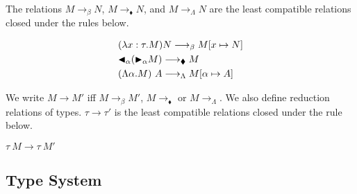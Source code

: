     The relations $M \longrightarrow_\beta N$, $M \longrightarrow_\blacklozenge N$, and $M \longrightarrow_\Lambda N$ are the least compatible relations closed under the rules below.
\begin{center}
  \begin{align*}
     & (\lambda x:\tau.M) N \longrightarrow_\beta M[x \mapsto N]         \\
     & {\mathop{\blacktriangleleft}}_\alpha ({\mathop{\blacktriangleright}}_\alpha M)\longrightarrow_\blacklozenge M         \\
     & (\Lambda \alpha.M)\ A \longrightarrow_\Lambda M[\alpha \mapsto A]
  \end{align*}
\end{center}

We write \( M \longrightarrow M' \) iff \( M \longrightarrow_{\beta} M' \), \(
M \longrightarrow_\blacklozenge \) or \( M \longrightarrow_\Lambda \). We also
define reduction relations of types. \( \tau \longrightarrow \tau' \) is the
least compatible relations closed under the rule below.
\begin{center}
    \( \tau\ M \longrightarrow \tau\ M' \)
\end{center}

\subsection{Type System}

  \begin{center}
    \infrule{
    }{
      \vdash \emptyset
    }
    \hfil
    \hfil
  \end{center}


  \begin{center}
    \infrule{
    }{
      \V \emptyset
    }
    \hfil
  \end{center}

  \begin{center}
     \hfil
  \end{center}

